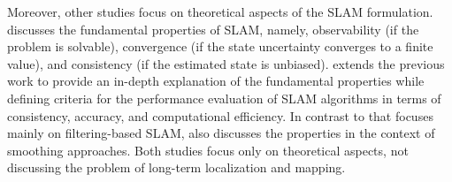 Moreover, other studies focus on theoretical aspects of the SLAM formulation. \cite{purpose:study:dissanayake:2011} discusses the fundamental properties of SLAM, namely, observability (if the problem is solvable), convergence (if the state uncertainty converges to a finite value), and consistency (if the estimated state is unbiased). \cite{purpose:study:huang-dissanayake:2016} extends the previous work to provide an in-depth explanation of the fundamental properties while defining criteria for the performance evaluation of SLAM algorithms in terms of consistency, accuracy, and computational efficiency. In contrast to \cite{purpose:study:dissanayake:2011} that focuses mainly on filtering-based SLAM, \cite{purpose:study:huang-dissanayake:2016} also discusses the properties in the context of smoothing approaches. Both studies focus only on theoretical aspects, not discussing the problem of long-term localization and mapping.

